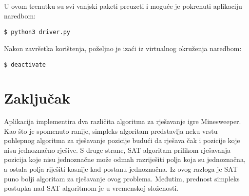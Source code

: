 \documentclass{article}
\numberwithin{figure}{section}
\numberwithin{table}{section}
\begin{document}
U ovom trenutku su svi vanjski paketi preuzeti i moguće je pokrenuti aplikaciju naredbom:
\begin{verbatim}
$ python3 driver.py
\end{verbatim}

Nakon završetka korištenja, poželjno je izaći iz virtualnog okruženja naredbom:
\begin{verbatim}
$ deactivate
\end{verbatim}


\section{Zaključak}

Aplikacija implementira dva različita algoritma za rješavanje igre Minesweeper.
Kao što je spomenuto ranije, simpleks algoritam predstavlja neku vrstu pohlepnog algoritma
za rješavanje pozicije budući da rješava čak i pozicije koje nisu jednoznačno rješive.
S druge strane, SAT algoritam prilikom rješavanja pozicija koje nisu jednoznačne može
odmah razriješiti polja koja su jednoznačna, a ostala polja riješiti kasnije kad
postanu jednoznačna. Iz ovog razloga je SAT puno bolji algoritam za rješavanje ovog
problema. Međutim, prednost simpleks postupka nad SAT algoritmom je u vremenskoj složenosti.

\printbibliography
\end{document}
